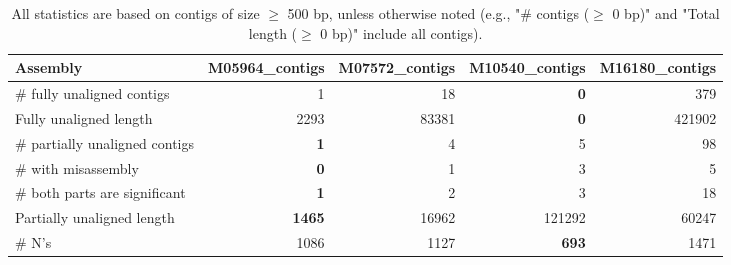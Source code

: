 \documentclass[12pt,a4paper]{article}
\begin{document}
\begin{table}[ht]
\begin{center}
\caption{All statistics are based on contigs of size $\geq$ 500 bp, unless otherwise noted (e.g., "\# contigs ($\geq$ 0 bp)" and "Total length ($\geq$ 0 bp)" include all contigs).}
\begin{tabular}{|l*{4}{|r}|}
\hline
Assembly & M05964\_contigs & M07572\_contigs & M10540\_contigs & M16180\_contigs \\ \hline
\# fully unaligned contigs & 1 & 18 & {\bf 0} & 379 \\ \hline
Fully unaligned length & 2293 & 83381 & {\bf 0} & 421902 \\ \hline
\# partially unaligned contigs & {\bf 1} & 4 & 5 & 98 \\ \hline
\hspace{5mm}\# with misassembly & {\bf 0} & 1 & 3 & 5 \\ \hline
\hspace{5mm}\# both parts are significant & {\bf 1} & 2 & 3 & 18 \\ \hline
Partially unaligned length & {\bf 1465} & 16962 & 121292 & 60247 \\ \hline
\# N's & 1086 & 1127 & {\bf 693} & 1471 \\ \hline
\end{tabular}
\end{center}
\end{table}
\end{document}
